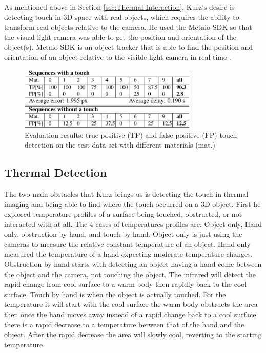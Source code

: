 \documentclass{sig-alternate}
\begin{document}
As mentioned above in Section \ref{sec:Thermal Interaction},  Kurz's desire is detecting touch in 3D space with real objects, which requires the ability to transform real objects relative to the camera. He used the Metaio SDK so that the visual light camera was able to get the position and orientation of the object(s). Metaio SDK is an object tracker that is able to find the position and orientation of an object relative to the visible light camera in real time \cite{Thermal}.  



\begin{figure}
	\includegraphics[width=8.5cm, height=3cm]{TouchData}
	\caption{Evaluation results: true positive (TP) and false positive (FP) touch detection on the test data set with different materials (mat.) \cite{Thermal}}
	\label{fig:TouchData}
\end{figure}


\subsection{Thermal Detection}
\label{Thermal Detection}
The two main obstacles that Kurz brings us is detecting the touch in thermal imaging and being able to find where the touch occurred on a 3D object. First he explored temperature profiles of a surface being touched, obstructed, or not interacted with at all. The 4 cases of temperatures profiles are: Object only, Hand only, obstruction by hand, and touch by hand. Object only is just using the cameras to measure the relative constant temperature of an object. Hand only measured the temperature of a hand expecting moderate temperature changes. Obstruction by hand starts with detecting an object having a hand come between the object and the camera, not touching the object. The infrared will detect the rapid change from cool surface to a warm body then rapidly back to the cool surface. Touch by hand is when the object is actually touched. For the temperature it will start with the cool surface the warm body obstructs the area then once the hand moves away instead of a rapid change back to a cool surface there is a rapid decrease to a temperature between that of the hand and the object. After the rapid decrease the area will slowly cool, reverting to the starting temperature. 
 
\end{document}
